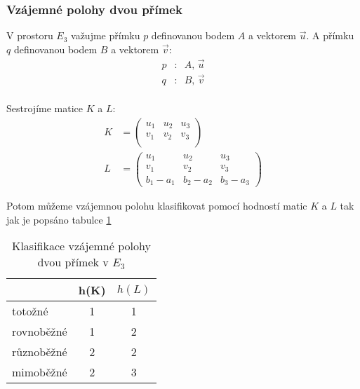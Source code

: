 \subsubsection{Vzájemné polohy dvou přímek}
V prostoru $E_3$ važujme přímku $p$ definovanou bodem $A$ a vektorem $\vec{u}$. A
přímku $q$ definovanou bodem $B$ a vektorem $\vec{v}$:
\begin{align*}
    p&: \;\; A,\,\vec{u}\\
    q&: \;\; B,\,\vec{v}\\
\end{align*}

Sestrojíme matice $K$ a $L$:
\begin{align*}
    K &=
    \begin{pmatrix}
        u_1 & u_2 & u_3\\
        v_1 & v_2 & v_3\\
    \end{pmatrix}\\
    L &=
    \begin{pmatrix}
        u_1 & u_2 & u_3\\
        v_1 & v_2 & v_3\\
        b_1 - a_1 & b_2 - a_2 &  b_3 - a_3
    \end{pmatrix}
\end{align*}

Potom můžeme vzájemnou polohu klasifikovat pomocí hodností matic $K$ a $L$ tak jak je popsáno
tabulce \ref{tab:roviny_poloha}
\begin{table}[h]
    \centering
    \begin{tabular}{|l|c|c|}
    \hline
     & \multicolumn{1}{l|}{h(K)} & \multicolumn{1}{l|}{$h(L)$} \\ \hline
    totožné & 1 & 1 \\ \hline
    rovnoběžné & 1 & 2 \\ \hline
    různoběžné & 2 & 2 \\ \hline
    mimoběžné & 2 & 3 \\ \hline
    \end{tabular}
    \caption{Klasifikace vzájemné polohy dvou přímek v $E_3$}
    \label{tab:roviny_poloha}
\end{table}

